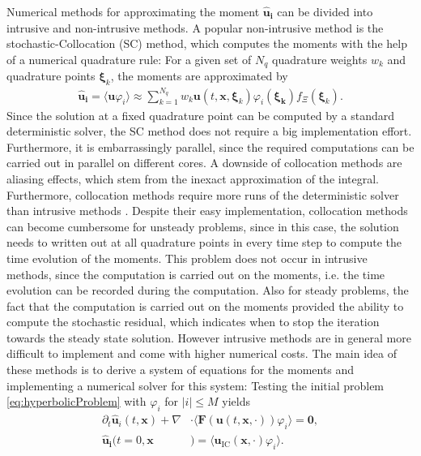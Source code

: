 Numerical methods for approximating the moment $\bm{\hat u_i}$ can be divided into intrusive and non-intrusive methods. A popular non-intrusive method is the stochastic-Collocation (SC) method, which computes the moments with the help of a numerical quadrature rule: For a given set of $N_q$ quadrature weights $w_k$ and quadrature points $\bm{\xi}_k$, the moments are approximated by
\begin{align*}
\bm{\hat u_i} = \langle \bm{u}\varphi_i \rangle \approx \sum_{k = 1}^{N_q}w_k \bm{u}({t,\bm{x},\bm{\xi}_k})\varphi_i(\bm{\xi_k})f_{\Xi}(\bm{\xi}_k).
\end{align*} 
Since the solution at a fixed quadrature point can be computed by a standard deterministic solver, the SC method does not require a big implementation effort. Furthermore, it is embarrassingly parallel, since the required computations can be carried out in parallel on different cores. A downside of collocation methods are aliasing effects, which stem from the inexact approximation of the integral. Furthermore, collocation methods require more runs of the deterministic solver than intrusive methods \cite{xiu2009fast,alekseev2011estimation}. Despite their easy implementation, collocation methods can become cumbersome for unsteady problems, since in this case, the solution needs to written out at all quadrature points in every time step to compute the time evolution of the moments.
This problem does not occur in intrusive methods, since the computation is carried out on the moments, i.e. the time evolution can be recorded during the computation. Also for steady problems, the fact that the computation is carried out on the moments provided the ability to compute the stochastic residual, which indicates when to stop the iteration towards the steady state solution. However intrusive methods are in general more difficult to implement and come with higher numerical costs. The main idea of these methods is to derive a system of equations for the moments and implementing a numerical solver for this system: Testing the initial problem \eqref{eq:hyperbolicProblem} with $\varphi_i$ for $|i|\leq M$ yields
\begin{subequations}\label{eq:nonClosedMomentSystem}
\begin{align}
\partial_t \bm{\hat u}_i(t,\bm{x}) + \nabla&\cdot\langle\bm{F}(\bm{u}(t,\bm{x},\cdot)) \varphi_i\rangle = \bm{0}, \\
\bm{\hat u_i}(t=0,\bm{x}&) = \langle\bm{u}_{\text{IC}}(\bm{x},\cdot)\varphi_i\rangle.
\end{align}
\end{subequations}
